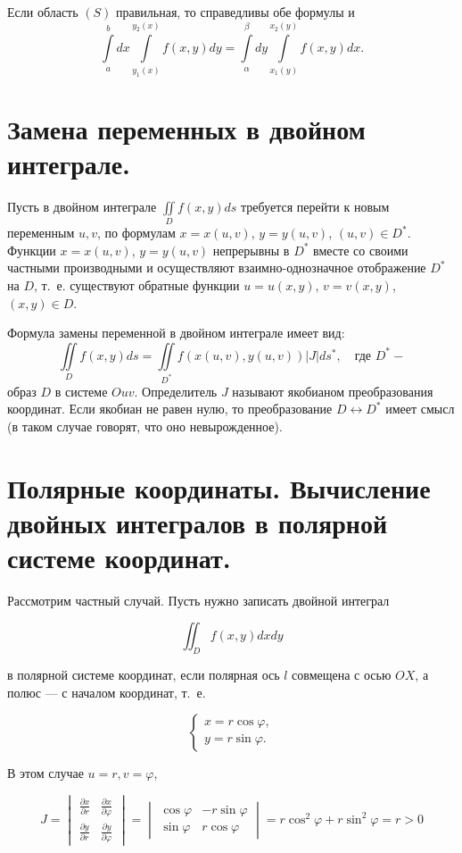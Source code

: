 \documentclass[16pt]{extarticle}
\begin{document}
Если область $(S)$ правильная, то справедливы обе формулы и
\[
  \int\limits_{a}^{b} dx \int\limits_{y_1(x)}^{y_2(x)} f(x,y) dy = \int\limits_{\alpha}^{\beta} dy \int\limits_{x_1(y)}^{x_2(y)} f(x,y) dx.
\]

\section{Замена переменных в двойном интеграле.}
Пусть в двойном интеграле \(\iint\limits_D f(x,y)ds\) требуется перейти к новым переменным \(u,v\),
по формулам \(x=x(u,v)\), \(y=y(u,v)\), \((u,v)\in D^*\). Функции \(x=x(u,v)\), \(y=y(u,v)\) непрерывны в \(D^*\)
вместе со своими частными производными и осуществляют взаимно-однозначное
отображение \(D^*\) на \(D\), т.~е. существуют обратные функции \(u=u(x,y)\), \(v=v(x,y)\), \((x,y)\in D\).

Формула замены переменной в двойном интеграле имеет вид:
\[
  \iint\limits_D f(x,y)ds = \iint\limits_{D^*} f(x(u,v),y(u,v))|J|ds^*, \quad \text{где } D^* -
\]
образ \(D\) в системе \(Ouv\). Определитель \(J\) называют якобианом преобразования
координат. Если якобиан не равен нулю, то преобразование \(D \leftrightarrow D^*\) имеет смысл (в таком
случае говорят, что оно невырожденное).
\section{Полярные координаты. Вычисление двойных интегралов в полярной системе координат.}
Рассмотрим частный случай. Пусть нужно записать двойной интеграл

\[
  \iint_D f(x, y) dxdy
\]

в полярной системе координат, если полярная ось \( l \) совмещена с осью \( OX \), а полюс --- с началом координат, т.~е.

\[
  \begin{cases}
    x = r\cos\varphi, \\
    y = r\sin\varphi.
  \end{cases}
\]

В этом случае \( u=r, v=\varphi \),

\[
  J =
  \begin{vmatrix}
    \frac{\partial x}{\partial r} & \frac{\partial x}{\partial \varphi} \\
    \frac{\partial y}{\partial r} & \frac{\partial y}{\partial \varphi}
  \end{vmatrix}
  =
  \begin{vmatrix}
    \cos\varphi & -r\sin\varphi \\
    \sin\varphi & r\cos\varphi
  \end{vmatrix}
  = r\cos^2\varphi + r\sin^2\varphi = r > 0
\]
\end{document}
